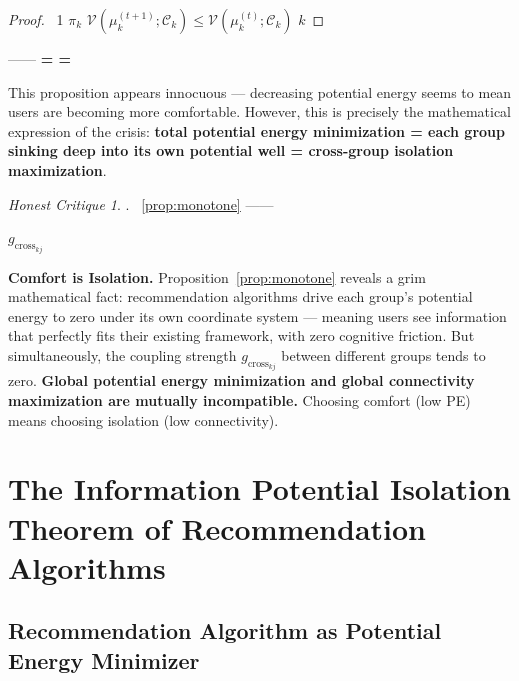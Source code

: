 \documentclass[11pt,a4paper]{article}
\theoremstyle{remark}
\newtheorem{honestattack}{Honest Critique}
\newenvironment{attackbox}{%
  \begin{center}
  \color{red}
  \begin{minipage}{0.92\textwidth}
  \begin{honestattack}
}{%
  \end{honestattack}
  \end{minipage}
  \end{center}
}
\newcommand{\GCoupling}{g_{\text{cross}}}
\newcommand{\CoordSys}{\mathcal{C}}
\newcommand{\InfoPE}{\mathcal{V}}
\begin{document}
\begin{proof}
~1 $\pi_k$ 
$\InfoPE(\mu_k^{(t+1)}; \CoordSys_k) \leq \InfoPE(\mu_k^{(t)}; \CoordSys_k)$
 $k$ 
\end{proof}

——
\textbf{ = 
= }

This proposition appears innocuous --- decreasing potential energy seems to mean users
are becoming more comfortable. However, this is precisely the mathematical expression of
the crisis: \textbf{total potential energy minimization = each group sinking deep into its
own potential well = cross-group isolation maximization}.

\begin{attackbox}
  \textbf{}.
  ~\ref{prop:monotone} 
  ——
  
  
   $\GCoupling_{kj}$ 
  \textbf{}
  

  \textbf{Comfort is Isolation.}
  Proposition~\ref{prop:monotone} reveals a grim mathematical fact:
  recommendation algorithms drive each group's potential energy to zero under its own
  coordinate system --- meaning users see information that perfectly fits their existing
  framework, with zero cognitive friction. But simultaneously, the coupling strength
  $\GCoupling_{kj}$ between different groups tends to zero.
  \textbf{Global potential energy minimization and global connectivity maximization
  are mutually incompatible.} Choosing comfort (low PE) means choosing isolation
  (low connectivity).
\end{attackbox}

\section{}
\section{The Information Potential Isolation Theorem of Recommendation Algorithms}

\subsection{}

\subsection{Recommendation Algorithm as Potential Energy Minimizer}
\end{document}
